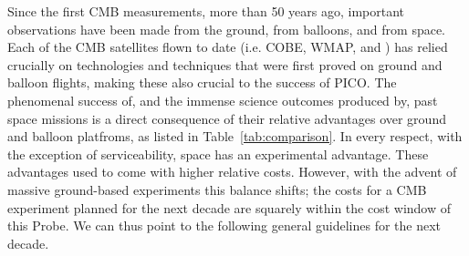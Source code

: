 \documentclass[PICOReport.tex]{subfiles}
\begin{document}

Since the first \ac{CMB} measurements, more than 50 years ago, important observations have been made from the ground, from balloons, and from space. Each of the CMB satellites flown to date (i.e. COBE, WMAP, and \planck) has relied crucially on technologies and techniques that were first proved on ground and balloon flights, making these also crucial to the success of PICO. The phenomenal success of, and the immense science outcomes produced by, past space missions is a direct consequence of their relative advantages over ground and balloon platfroms, as listed in 
Table~\ref{tab:comparison}. In every respect, with the exception of serviceability, space has an experimental advantage. These advantages used to come with higher relative costs. However, with the advent of massive ground-based experiments this balance shifts; the costs for a CMB experiment planned for the next decade are squarely within the cost window of this Probe. We can thus point to the following general guidelines for the next decade. 
\end{document}
